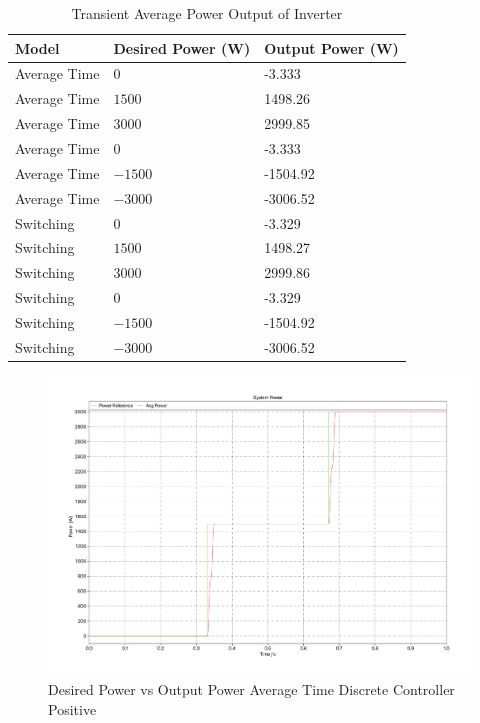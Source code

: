 \documentclass[12pt]{article}
\begin{document}
\begin{table}[ht]
    \caption{Transient Average Power Output of Inverter}
    \label{tab:z-c-transient}
    \centering{}
    \begin{tabular}{ l l l }
        \hline
        Model        & Desired Power (W) & Output Power (W) \\
        \hline
        Average Time & $0$               & -3.333           \\
        Average Time & $1500$            & 1498.26          \\
        Average Time & $3000$            & 2999.85          \\
        \hline
        Average Time & $0$               & -3.333           \\
        Average Time & $-1500$           & -1504.92         \\
        Average Time & $-3000$           & -3006.52         \\
        \hline
        Switching    & $0$               & -3.329           \\
        Switching    & $1500$            & 1498.27          \\
        Switching    & $3000$            & 2999.86          \\
        \hline
        Switching    & $0$               & -3.329           \\
        Switching    & $-1500$           & -1504.92         \\
        Switching    & $-3000$           & -3006.52         \\
        \hline
    \end{tabular}
\end{table}

\begin{figure}[ht]
    \centering{}
    \includegraphics[width=\textwidth, height=0.4\textheight, keepaspectratio]{img/Average Time Z-C Power Positive.pdf}
    \caption{Desired Power vs Output Power Average Time Discrete Controller Positive}
    \label{fig:avg-time-z-c-power-positive}
\end{figure}
\end{document}

